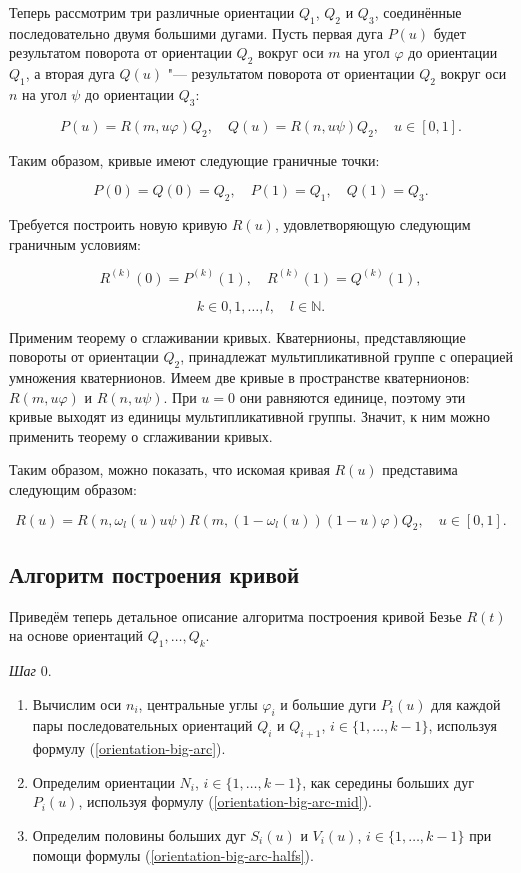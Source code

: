 Теперь рассмотрим три различные ориентации $Q_1$, $Q_2$ и $Q_3$, соединённые последовательно двумя большими
дугами. Пусть первая дуга $P(u)$ будет результатом поворота от ориентации $Q_2$ вокруг оси $m$ на угол $\varphi$ до
ориентации $Q_1$, а вторая дуга $Q(u)$ "--- результатом поворота от ориентации $Q_2$ вокруг оси $n$ на угол $\psi$ до
ориентации $Q_3$:

$$
P(u)=R(m,u\varphi)Q_2, \quad Q(u)=R(n,u\psi)Q_2, \quad u \in [0,1].
$$

Таким образом, кривые имеют следующие граничные точки:

$$
P(0)=Q(0)=Q_2, \quad P(1)=Q_1, \quad Q(1)=Q_3.
$$

Требуется построить новую кривую $R(u)$, удовлетворяющую следующим граничным условиям:

$$
R^{(k)}(0)=P^{(k)}(1), \quad R^{(k)}(1)=Q^{(k)}(1),
$$

$$
k \in {0,1,\dots,l}, \quad l \in \mathbb{N}.
$$

Применим теорему о сглаживании кривых. Кватернионы, представляющие повороты от ориентации $Q_2$, принадлежат
мультипликативной группе с операцией умножения кватернионов. Имеем две кривые в пространстве кватернионов:
$R(m,u\varphi)$ и $R(n,u\psi)$. При $u=0$ они равняются единице, поэтому эти кривые выходят из единицы мультипликативной
группы. Значит, к ним можно применить теорему о сглаживании кривых.

Таким образом, можно показать, что искомая кривая $R(u)$ представима следующим образом:

$$
R(u)=R(n,\omega_l(u)u\psi)R(m,(1-\omega_l(u))(1-u)\varphi)Q_2, \quad u \in [0,1].
$$

\subsection*{Алгоритм построения кривой}

Приведём теперь детальное описание алгоритма построения кривой Безье $R(t)$ на основе ориентаций $Q_1,\dots,Q_k$.

\bigskip
\textit{Шаг} 0.

\begin{enumerate}
\item Вычислим оси $n_i$, центральные углы $\varphi_i$ и большие дуги $P_i(u)$ для каждой пары последовательных ориентаций
$Q_i$ и $Q_{i+1}$, $i \in \{1,\dots,k-1\}$, используя формулу (\ref{orientation-big-arc}).
\item Определим ориентации $N_i$, $i \in \{1,\dots,k-1\}$, как середины больших дуг $P_i(u)$, используя формулу
(\ref{orientation-big-arc-mid}).
\item Определим половины больших дуг $S_i(u)$ и $V_i(u)$, $i \in \{1,\dots,k-1\}$ при помощи формулы
(\ref{orientation-big-arc-halfs}).
\end{enumerate}

